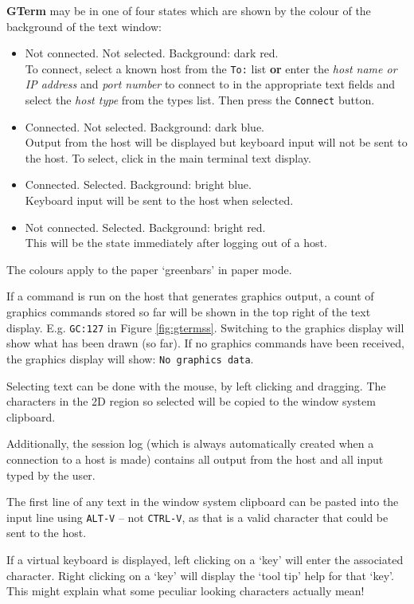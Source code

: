 \documentclass[a4paper,twoside,11pt]{article}
\newcommand{\newpara}{\par\vspace{4mm}\noindent}
\begin{document}
\newpara
\textbf{GTerm} may be in one of four states which are shown by the colour of the background of the text window:
\begin{itemize}
\item Not connected. Not selected. Background: dark red.\\
      To connect, select a known host from the \texttt{To:} list \textbf{or} enter the \textit{host name or IP address}
      and \textit{port number} to connect to in the appropriate
      text fields and select the \textit{host type} from the types list. Then press the \texttt{Connect} button.
\item Connected. Not selected. Background: dark blue.\\
      Output from the host will be displayed but keyboard input will not be sent to the host.
      To select, click in the main terminal text display.
\item Connected. Selected. Background: bright blue.\\
      Keyboard input will be sent to the host when selected.
\item Not connected. Selected. Background: bright red.\\
      This will be the state immediately after logging out of a host.
\end{itemize}
The colours apply to the paper `greenbars' in paper mode.
\newpara
If a command is run on the host that generates graphics output, a count of graphics commands
stored so far will be shown in the top right of the text display. E.g. \texttt{GC:127} in Figure \ref{fig:gtermss}.
Switching to the graphics display will show what has been drawn (so far). If no graphics commands have been
received, the graphics display will show: \texttt{No graphics data}.
\newpara
Selecting text can be done with the mouse, by left clicking and dragging. The characters in the 2D region so selected
will be copied to the window system clipboard.  
\newpara
Additionally, the session log (which is always
automatically created when a connection to a host is made) contains all output from the host and all input
typed by the user.
\newpara
The first line of any text in the window system clipboard can be pasted into the input line using \texttt{ALT-V} -- not
\texttt{CTRL-V}, as that is a valid character that could be sent to the host.
\newpara
If a virtual keyboard is displayed, left clicking on a `key' will enter the associated character.
Right clicking on a `key' will display the `tool tip' help for that `key'. This might explain what
some peculiar looking characters actually mean!
\end{document}
